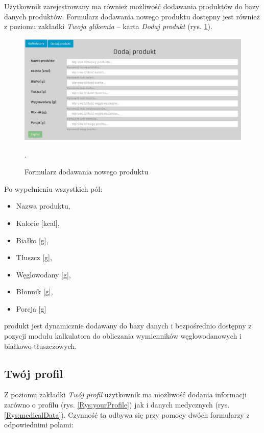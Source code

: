 \newpage

Użytkownik zarejestrowany ma również możliwość dodawania produktów do bazy danych produktów. Formularz dodawania nowego produktu dostępny jest również z poziomu zakładki \textit{Twoja glikemia} -- karta \textit{Dodaj produkt} (rys. \ref{Rys:addProduct}). 

\begin{figure}[h]
	\centering\includegraphics[scale=0.5]{images/add_product.jpg}
	\caption{Formularz dodawania nowego produktu}.
	\label{Rys:addProduct}
\end{figure}

Po wypełnieniu wszystkich pól: 
\begin{itemize}
	\item Nazwa produktu,
	\item Kalorie [kcal],
	\item Białko [g],
	\item Tłuszcz [g],
	\item Węglowodany [g],
	\item Błonnik [g],
	\item Porcja [g]
\end{itemize}
produkt jest dynamicznie dodawany do bazy danych i bezpośrednio dostępny z pozycji modułu kalkulatora do obliczania wymienników węglowodanowych i białkowo-tłuszczowych.

\subsection{Twój profil}
Z poziomu zakładki \textit{Twój profil} użytkownik ma możliwość dodania informacji zarówno o profilu (rys. \ref{Rys:yourProfile}) jak i danych medycznych (rys. \ref{Rys:medicalData}). Czynność ta odbywa się przy pomocy dwóch formularzy z odpowiednimi polami:

